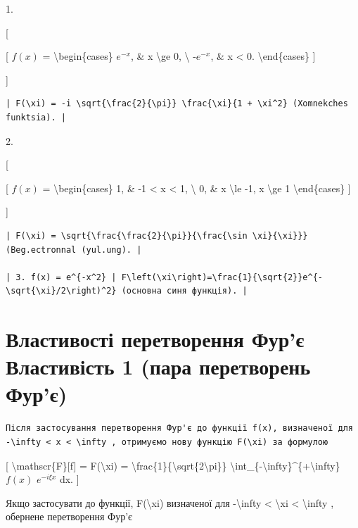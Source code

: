 \documentclass[
]{article}
\begin{document}
{{1.

{[}

{[} \(f(x)\) = \textbackslash begin\{cases\} \(e^{-x}\), \& x
\textbackslash ge 0, \textbackslash{} -\(e^{-x}\), \& x \textless{} 0.
\textbackslash end\{cases\} {]}

{]}

\begin{verbatim}
| F(\xi) = -i \sqrt{\frac{2}{\pi}} \frac{\xi}{1 + \xi^2} (Xomnekches funktsia). |
\end{verbatim}

2.

{[}

{[} \(f(x)\) = \textbackslash begin\{cases\} 1, \& -1 \textless{} x
\textless{} 1, \textbackslash{} 0, \& x \textbackslash le -1, x
\textbackslash ge 1 \textbackslash end\{cases\} {]}

{]}

\begin{verbatim}
| F(\xi) = \sqrt{\frac{\frac{2}{\pi}}{\frac{\sin \xi}{\xi}}} (Beg.ectronnal (yul.ung). |

| 3. f(x) = e^{-x^2} | F\left(\xi\right)=\frac{1}{\sqrt{2}}e^{-\sqrt{\xi}/2\right)^2} (основна синя функція). |
\end{verbatim}

\section{Властивості перетворення Фур'є Властивість 1 (пара перетворень
Фур'є)}\label{ux432ux43bux430ux441ux442ux438ux432ux43eux441ux442ux456-ux43fux435ux440ux435ux442ux432ux43eux440ux435ux43dux43dux44f-ux444ux443ux440ux454-ux432ux43bux430ux441ux442ux438ux432ux456ux441ux442ux44c-1-ux43fux430ux440ux430-ux43fux435ux440ux435ux442ux432ux43eux440ux435ux43dux44c-ux444ux443ux440ux454}

\begin{verbatim}
Після застосування перетворення Фур'є до функції f(x), визначеної для -\infty < x < \infty , отримуємо нову функцію F(\xi) за формулою
\end{verbatim}

{[} \textbackslash mathscr\{F\}{[}f{]} = F(\textbackslash xi) =
\textbackslash frac\{1\}\{\textbackslash sqrt\{2\textbackslash pi\}\}
\textbackslash int\_\{-\textbackslash infty\}\^{}\{+\textbackslash infty\}
\(f(x)\) \(e^{-i\xi x}\) dx. {]}

Якщо застосувати до функції, F(\textbackslash xi) визначеної для
-\textbackslash infty \textless{} \textbackslash xi \textless{}
\textbackslash infty , обернене перетворення Фур'є

}}
\end{document}

